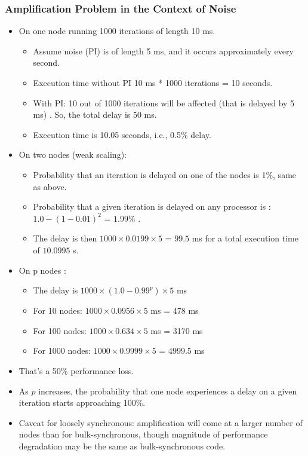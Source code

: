 \begin{frame}[label=noiseAmpExample]
\frametitle{Amplification Problem in the Context of Noise}
\begin{itemize}
\item \small On one node running 1000 iterations of length 10 ms. 
\begin{itemize}
\tiny \item \tiny Assume noise (PI) is of length 5 ms, and it occurs approximately every second.
\item \tiny Execution time without PI 10 ms * 1000 iterations = 10 seconds. 
\item \tiny With PI: 10 out of 1000 iterations will be affected (that is delayed by 5 ms) .  So, the total delay is 50 ms.
\item \tiny Execution time is 10.05 seconds, i.e., 0.5\% delay. 
\end{itemize}
\item \small On two nodes (weak scaling):
\begin{itemize}
\item \tiny Probability that an iteration is delayed on one of the nodes is 1\%, same as above.
\item \tiny Probability that a given iteration is delayed on any processor is : $1.0 - (1 - 0.01)^2$ = $1.99$\% .
\item \tiny The delay is then $1000 \times 0.0199 \times 5$  = $99.5$ ms for a total execution time of $10.0995$ s. 
\end{itemize}
\item \small On p nodes :
\begin{itemize}
\item \tiny The delay is $1000 \times (1.0 - 0.99^p) \times 5$ ms
\item \tiny For 10 nodes: $1000 \times 0.0956 \times 5$ ms =  478 ms
\item \tiny For 100 nodes: $1000 \times 0.634 \times 5$ ms = 3170 ms
\item \tiny For 1000 nodes: $1000 \times 0.9999 \times 5$ = 4999.5 ms
\end{itemize}
\item \small That's a 50\% performance loss. 
\item \small As $p$ increases, the probability that one node experiences a delay on a given iteration starts approaching 100\%. 
\small \item \small Caveat for loosely synchronous: amplification will come at a larger number of nodes than for bulk-synchronous, though magnitude of performance degradation may be the same as bulk-synchronous code. 
\end{itemize}
\end{frame}

